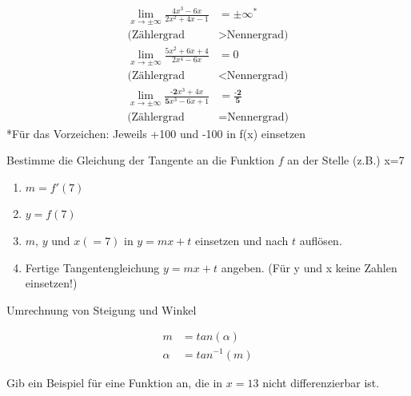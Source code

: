 \documentclass[paper=a6,landscape,ngerman,twoside=true,fontsize=12pt]{scrartcl}
\begin{document}
\begin{antwort}
	\large
	\begin{align*}
	\lim\limits_{x \rightarrow \pm\infty}{\frac{4x^3 - 6x}{2x^2+4x-1}}&=\pm\infty^* \\
	\text{(Zählergrad } &> \text{Nennergrad)}
	\end{align*}
	\begin{align*}
	\lim\limits_{x \rightarrow \pm\infty}{\frac{5x^2+6x+4}{2x^4-6x}}&=0 \\
	\text{(Zählergrad } &< \text{Nennergrad)}
	\end{align*}
	\begin{align*}
	\lim\limits_{x \rightarrow \pm\infty}{\frac{\textbf{-2}x^3+4x}{\textbf{5}x^3 - 6x+1}}&=\frac{\textbf{-2}}{\textbf{5}} \\
	\text{(Zählergrad } &= \text{Nennergrad)}
	\end{align*}
	\footnotesize 
	*Für das Vorzeichen: Jeweils +100 und -100 in f(x) einsetzen
\end{antwort}
\begin{frage}
	Bestimme die Gleichung der Tangente an die Funktion $f$ an der Stelle (z.B.) x=7
\end{frage}
\begin{antwort}
	\begin{enumerate}
		\item $m=f'(7)$
		\item $y=f(7)$
		\item $m$, $y$ und $x(=7)$ in $y= mx+t$ einsetzen und nach $t$ auflösen.
		\item Fertige Tangentengleichung $y= mx+t$ angeben. (Für y und x keine Zahlen einsetzen!)
		
	\end{enumerate}
\end{antwort}
\begin{frage}
	Umrechnung von Steigung und Winkel
\end{frage}
\begin{antwort}
	 \begin{align*}
	 m&=tan(\alpha) \\
	 \alpha&=tan^{-1}(m)
	 \end{align*}
\end{antwort}
\begin{frage}
	Gib ein Beispiel für eine Funktion an, die in $x=13$ nicht differenzierbar ist.
\end{frage}
\end{document}
